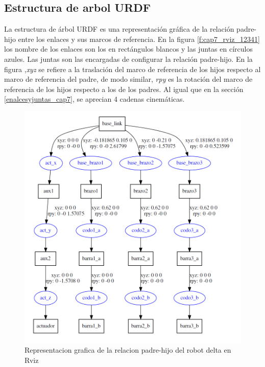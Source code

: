 \newpage

    \subsection{Estructura de arbol URDF}
    La estructura de árbol URDF es una representación gráfica de la relación padre-hijo entre los enlaces y sus marcos de referencia. En la figura \eqref{f:cap7_rviz_12341} los nombre de los enlaces son los en rectángulos blancos y las juntas en círculos azules. Las juntas son las encargadas de configurar la relación padre-hijo. En la figura ,\textit{xyz} se refiere a la traslación del marco de referencia de los hijos respecto al marco de referencia del padre, de modo similar, \textit{rpy} es la rotación del marco de referencia de los hijos respecto a los de los padres. Al igual que en la sección \eqref{enalcesyjuntas_cap7}, se aprecian 4 cadenas cinemáticas.

        \begin{figure}[h]
            \centering
            \includegraphics[width=1.0\linewidth]{Main/Chapter7/Images7/rviz_1.png}
            \caption{Representacion grafica de la relacion padre-hijo del robot delta en Rviz}
            \label{f:cap7_rviz_12341}
        \end{figure}  
    
